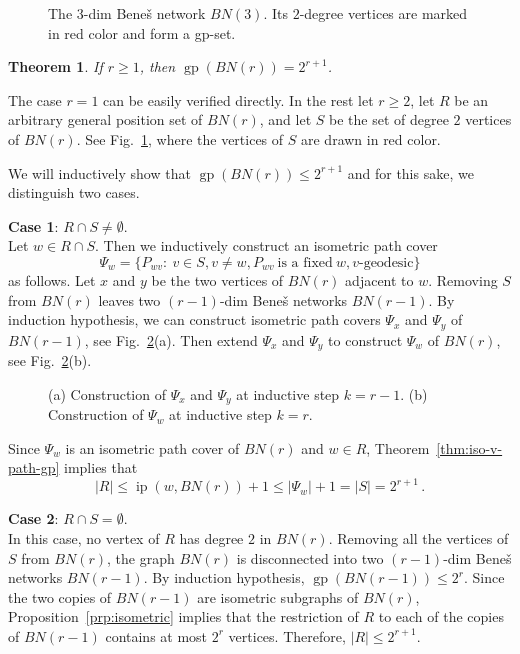 \documentclass[12pt]{article}
\newtheorem{theorem}{Theorem}[section]
\newcommand{\proof}{\noindent{\bf Proof.\ }}
\DeclareMathOperator {\gp} {gp}
\DeclareMathOperator {\ip} {ip}
\begin{document}
\begin{figure}[ht!]
	\begin{center}
	\end{center}
	\caption{The $3$-dim Bene\v{s} network $BN(3)$. Its $2$-degree vertices are marked in red color and form a gp-set.}
	\label{fig:Benes-3-dim}
\end{figure}

\begin{theorem}
\label{thm:Benes}
If $r\ge 1$, then $\gp(BN(r)) = 2^{r+1}$.
\end{theorem}

\proof
The case $r=1$ can be easily verified directly. In the rest let $r\ge 2$, let $R$ be an arbitrary general position set of $BN(r)$, and let $S$ be the set of degree $2$ vertices of $BN(r)$. See Fig.~\ref{fig:Benes-3-dim}, where the vertices of $S$ are drawn in red color. 

We will inductively show that $\gp(BN(r)) \le 2^{r+1}$ and for this sake, we distinguish two cases. 

\medskip\noindent
{\bf Case 1}: $R\cap S \neq \emptyset$. \\
Let $w\in R\cap S$. Then we inductively construct an isometric path cover 
$$\Psi_w = \{P_{wv}:\ v \in S, v \neq w, P_{wv}\ \mbox{is\ a\ fixed}\ w,v\mbox{-geodesic}\}$$ 
as follows. Let $x$ and $y$ be the two vertices of $BN(r)$ adjacent to $w$. Removing $S$ from $BN(r)$ leaves two $(r-1)$-dim Bene\v{s} networks $BN(r-1)$. By induction hypothesis, we can construct isometric path covers $\Psi_x$ and $\Psi_y$ of $BN(r-1)$, see Fig.~\ref{fig:Benes-Psi_w}(a). Then extend $\Psi_x$ and $\Psi_y$ to construct $\Psi_w$ of $BN(r)$, see Fig.~\ref{fig:Benes-Psi_w}(b).

\begin{figure}[ht!]
	\begin{center}
	\end{center}
	\caption{(a) Construction of $\Psi_x$ and $\Psi_y$ at inductive step $k = r-1$. (b) Construction of $\Psi_w$ at inductive step $k = r$.}
	\label{fig:Benes-Psi_w}
\end{figure}

Since $\Psi_w$ is an isometric path cover of $BN(r)$ and $w\in R$, Theorem~\ref{thm:iso-v-path-gp} implies that 
$$|R| \le \ip(w,BN(r)) + 1 \le |\Psi_w| + 1 = |S| = 2^{r+1}\,.$$

\medskip\noindent
{\bf Case 2}: $R \cap S = \emptyset$. \\
In this case, no vertex of $R$ has degree $2$ in $BN(r)$. Removing all the vertices of $S$ from $BN(r)$, the graph $BN(r)$ is disconnected into two $(r-1)$-dim Bene\v{s} networks $BN(r-1)$. By induction hypothesis, $\gp(BN(r-1)) \le 2^{r}$. Since the two copies of $BN(r-1)$ are isometric subgraphs of $BN(r)$, Proposition~\ref{prp:isometric} implies that the restriction of $R$ to each of the copies of $BN(r-1)$ contains at most $2^{r}$ vertices. Therefore, $|R| \le 2^{r+1}$. 
\end{document}
